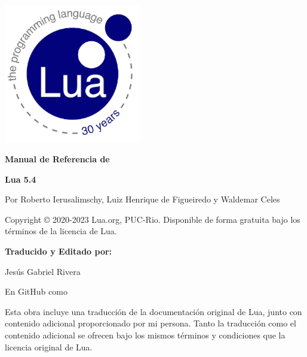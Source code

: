 \documentclass[12pt, openany]{book}
\begin{document}
\thispagestyle{empty}
\begin{center}
	\includegraphics[width=6cm]{logo-lua-intro} %

	\vspace{5mm}

	{\Huge \textcolor{blue_lua}{\textbf{Manual de Referencia de}}}

	{\Huge \textcolor{blue_lua}{\textbf{Lua 5.4}}}

	\vspace{1cm}

	Por Roberto Ierusalimschy, Luiz Henrique de Figueiredo y Waldemar Celes

\end{center}

\vfill

\begin{center}
	Copyright © 2020-2023 Lua.org, PUC-Rio. Disponible de forma gratuita bajo los términos de la licencia de Lua.
\end{center}
\newpage  %

\thispagestyle{empty}
\textcolor{white}{} %
\newpage  %


\thispagestyle{empty}

\textbf{Traducido y Editado por:}

Jesús Gabriel Rivera

En GitHub como 

\vspace{15mm}

Esta obra incluye una traducción de la documentación original de Lua, junto con contenido adicional proporcionado por mi persona. Tanto la traducción como el contenido adicional se ofrecen bajo los mismos términos y condiciones que la licencia original de Lua.
\end{document}
